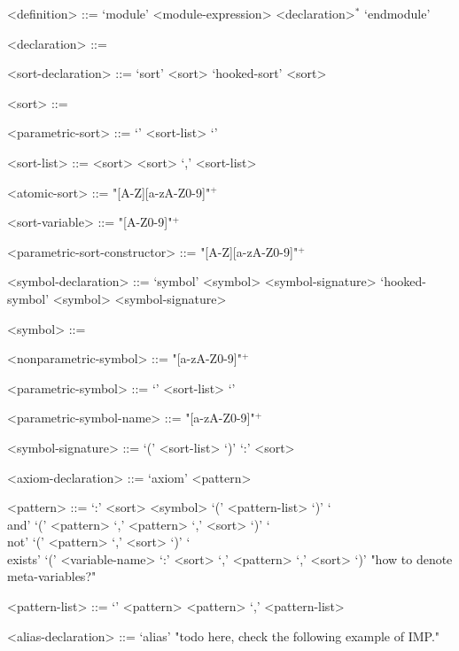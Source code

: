 \documentclass[UTF8,11pt]{article}
\theoremstyle{plain}
\theoremstyle{definition}
\theoremstyle{remark}
\begin{document}
\begin{grammar}\small
	<definition>    ::= \quad
	\alt `module' <module-expression> <declaration>$^*$ `endmodule'
	
	<declaration>   ::= \quad
	\alt <sort-declaration> 
	\alt <symbol-declaration> 
	\alt <axiom-declaration>
	\alt <alias-declaration>
	
	<sort-declaration> ::= \quad
	\alt `sort' <sort>
	\alt `hooked-sort' <sort> 
	
	<sort> ::= \quad
	\alt <atomic-sort> 
	\alt <parametric-sort>
	
	<parametric-sort> ::= \quad
	\alt <parametric-sort-constructor> `{' <sort-list> `}'
	
	<sort-list> ::= \quad 
	\alt <sort> 
	\alt <sort> `,' <sort-list>
	
	<atomic-sort> ::= "[A-Z][a-zA-Z0-9]"$^+$
	
	<sort-variable> ::= "[A-Z0-9]"$^+$
	
	<parametric-sort-constructor> ::= "[A-Z][a-zA-Z0-9]"$^+$
	
	<symbol-declaration> ::= \quad
	\alt `symbol' <symbol> <symbol-signature>
	\alt `hooked-symbol' <symbol> <symbol-signature>
	
	<symbol> ::= \quad
	\alt <nonparametric-symbol>
	\alt <parametric-symbol>
	
	<nonparametric-symbol> ::= "[a-zA-Z0-9]"$^+$
	
	<parametric-symbol> ::= \quad
	\alt <parametric-symbol-name> `{' <sort-list> `}'
	
	<parametric-symbol-name> ::= "[a-zA-Z0-9]"$^+$
	
	<symbol-signature> ::= \quad
	\alt `(' <sort-list> `)' `:' <sort>
	
	<axiom-declaration> ::= \quad
	\alt `axiom' <pattern>
	
	<pattern> ::= \quad
	\alt <variable-name> `:' <sort>
	\alt <symbol> `(' <pattern-list> `)'
	\alt `\\and' `(' <pattern> `,' <pattern> `,' <sort> `)'
	\alt `\\not' `(' <pattern> `,' <sort> `)' 
	\alt `\\exists' `(' <variable-name> `:' <sort> `,' <pattern> `,' <sort> `)'
	\alt "how to denote meta-variables?"
	
	<pattern-list> ::= \quad
	\alt `' 
	\alt <pattern> 
	\alt <pattern> `,' <pattern-list>
	
	<alias-declaration> ::= \quad
	\alt `alias' "todo here, check the following example of IMP."
\end{grammar}
\end{document}
